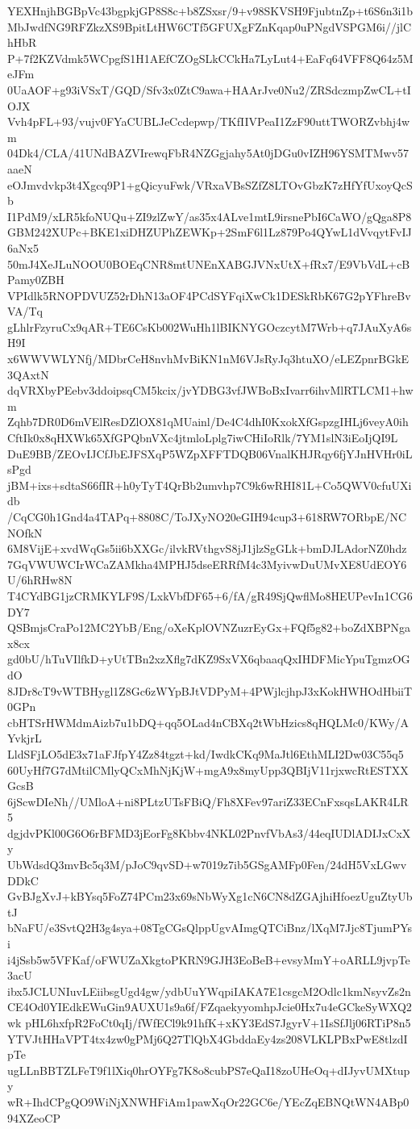YEXHnjhBGBpVc43bgpkjGP8S8c+b8ZSxsr/9+v98SKVSH9FjubtnZp+t6S6n3i1b
MbJwdfNG9RFZkzXS9BpitLtHW6CTf5GFUXgFZnKqap0uPNgdVSPGM6i//jlChHbR
P+7f2KZVdmk5WCpgfS1H1AEfCZOgSLkCCkHa7LyLut4+EaFq64VFF8Q64z5MeJFm
0UaAOF+g93iVSxT/GQD/Sfv3x0ZtC9awa+HAArJve0Nu2/ZRSdczmpZwCL+tIOJX
Vvh4pFL+93/vujv0FYaCUBLJeCcdepwp/TKfIIVPeaI1ZzF90uttTWORZvbhj4wm
04Dk4/CLA/41UNdBAZVIrewqFbR4NZGgjahy5At0jDGu0vIZH96YSMTMwv57aaeN
eOJmvdvkp3t4Xgcq9P1+gQicyuFwk/VRxaVBsSZfZ8LTOvGbzK7zHfYfUxoyQcSb
I1PdM9/xLR5kfoNUQu+ZI9zlZwY/as35x4ALve1mtL9irsnePbI6CaWO/gQga8P8
GBM242XUPc+BKE1xiDHZUPhZEWKp+2SmF6l1Lz879Po4QYwL1dVvqytFvIJ6aNx5
50mJ4XeJLuNOOU0BOEqCNR8mtUNEnXABGJVNxUtX+fRx7/E9VbVdL+cBPamy0ZBH
VPIdlk5RNOPDVUZ52rDhN13aOF4PCdSYFqiXwCk1DESkRbK67G2pYFhreBvVA/Tq
gLhlrFzyruCx9qAR+TE6CsKb002WuHh1lBIKNYGOczcytM7Wrb+q7JAuXyA6sH9I
x6WWVWLYNfj/MDbrCeH8nvhMvBiKN1nM6VJsRyJq3htuXO/eLEZpnrBGkE3QAxtN
dqVRXbyPEebv3ddoipsqCM5kcix/jvYDBG3vfJWBoBxIvarr6ihvMlRTLCM1+hwm
Zqhb7DR0D6mVElResDZlOX81qMUainl/De4C4dhI0KxokXfGspzgIHLj6veyA0ih
CftIk0x8qHXWk65XfGPQbnVXc4jtmloLplg7iwCHiIoRlk/7YM1slN3iEoIjQI9L
DuE9BB/ZEOvIJCfJbEJFSXqP5WZpXFFTDQB06VnalKHJRqy6fjYJnHVHr0iLsPgd
jBM+ixs+sdtaS66fIR+h0yTyT4QrBb2umvhp7C9k6wRHI81L+Co5QWV0cfuUXidb
/CqCG0h1Gnd4a4TAPq+8808C/ToJXyNO20eGIH94cup3+618RW7ORbpE/NCNOfkN
6M8VijE+xvdWqGs5ii6bXXGc/ilvkRVthgvS8jJ1jlzSgGLk+bmDJLAdorNZ0hdz
7GqVWUWCIrWCaZAMkha4MPHJ5dseERRfM4c3MyivwDuUMvXE8UdEOY6U/6hRHw8N
T4CYdBG1jzCRMKYLF9S/LxkVbfDF65+6/fA/gR49SjQwflMo8HEUPevIn1CG6DY7
QSBmjsCraPo12MC2YbB/Eng/oXeKplOVNZuzrEyGx+FQf5g82+boZdXBPNgax8cx
gd0bU/hTuVIlfkD+yUtTBn2xzXflg7dKZ9SxVX6qbaaqQxIHDFMicYpuTgmzOGdO
8JDr8cT9vWTBHygl1Z8Gc6zWYpBJtVDPyM+4PWjlcjhpJ3xKokHWHOdHbiiT0GPn
cbHTSrHWMdmAizb7u1bDQ+qq5OLad4nCBXq2tWbHzics8qHQLMc0/KWy/AYvkjrL
LldSFjLO5dE3x71aFJfpY4Zz84tgzt+kd/IwdkCKq9MaJtl6EthMLI2Dw03C55q5
60UyHf7G7dMtilCMlyQCxMhNjKjW+mgA9x8myUpp3QBIjV11rjxwcRtESTXXGcsB
6jScwDIeNh//UMloA+ni8PLtzUTsFBiQ/Fh8XFev97ariZ33ECnFxsqsLAKR4LR5
dgjdvPKl00G6O6rBFMD3jEorFg8Kbbv4NKL02PnvfVbAs3/44eqIUDlADIJxCxXy
UbWdsdQ3mvBc5q3M/pJoC9qvSD+w7019z7ib5GSgAMFp0Fen/24dH5VxLGwvDDkC
GvBJgXvJ+kBYsq5FoZ74PCm23x69sNbWyXg1cN6CN8dZGAjhiHfoezUguZtyUbtJ
bNaFU/e3SvtQ2H3g4sya+08TgCGsQlppUgvAImgQTCiBnz/lXqM7Jjc8TjumPYsi
i4jSsb5w5VFKaf/oFWUZaXkgtoPKRN9GJH3EoBeB+evsyMmY+oARLL9jvpTe3acU
ibx5JCLUNIuvLEiibsgUgd4gw/ydbUuYWqpiIAKA7E1csgcM2Odlc1kmNsyvZs2n
CE4Od0YIEdkEWuGin9AUXU1s9a6f/FZqaekyyomhpJcie0Hx7u4eGCkeSyWXQ2wk
pHL6hxfpR2FoCt0qIj/fWfECl9k91hfK+xKY3EdS7JgyrV+1IsSfJlj06RTiP8n5
YTVJtHHaVPT4tx4zw0gPMj6Q27TlQbX4GbddaEy4zs208VLKLPBxPwE8tlzdIpTe
ugLLnBBTZLFeT9f1lXiq0hrOYFg7K8o8cubPS7eQaI18zoUHeOq+dIJyvUMXtupy
wR+IhdCPgQO9WiNjXNWHFiAm1pawXqOr22GC6e/YEcZqEBNQtWN4ABp094XZeoCP
